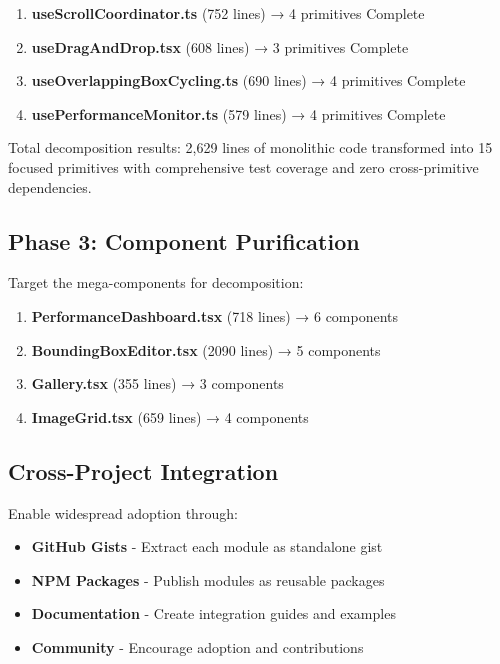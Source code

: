 \documentclass[11pt]{article}
\begin{document}
\begin{enumerate}
\item \textbf{useScrollCoordinator.ts} (752 lines) → 4 primitives Complete
\item \textbf{useDragAndDrop.tsx} (608 lines) → 3 primitives Complete
\item \textbf{useOverlappingBoxCycling.ts} (690 lines) → 4 primitives Complete
\item \textbf{usePerformanceMonitor.ts} (579 lines) → 4 primitives Complete
\end{enumerate}

Total decomposition results: 2,629 lines of monolithic code transformed into 15 focused primitives with comprehensive test coverage and zero cross-primitive dependencies.

\subsection{Phase 3: Component Purification}

Target the mega-components for decomposition:

\begin{enumerate}
\item \textbf{PerformanceDashboard.tsx} (718 lines) → 6 components
\item \textbf{BoundingBoxEditor.tsx} (2090 lines) → 5 components
\item \textbf{Gallery.tsx} (355 lines) → 3 components
\item \textbf{ImageGrid.tsx} (659 lines) → 4 components
\end{enumerate}

\subsection{Cross-Project Integration}

Enable widespread adoption through:

\begin{itemize}
\item \textbf{GitHub Gists} - Extract each module as standalone gist
\item \textbf{NPM Packages} - Publish modules as reusable packages
\item \textbf{Documentation} - Create integration guides and examples
\item \textbf{Community} - Encourage adoption and contributions
\end{itemize}
\end{document}
